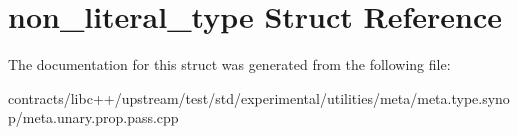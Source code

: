 \hypertarget{structnon__literal__type}{}\section{non\+\_\+literal\+\_\+type Struct Reference}
\label{structnon__literal__type}


The documentation for this struct was generated from the following file\+:\begin{DoxyCompactItemize}
\item 
contracts/libc++/upstream/test/std/experimental/utilities/meta/meta.\+type.\+synop/meta.\+unary.\+prop.\+pass.\+cpp\end{DoxyCompactItemize}
